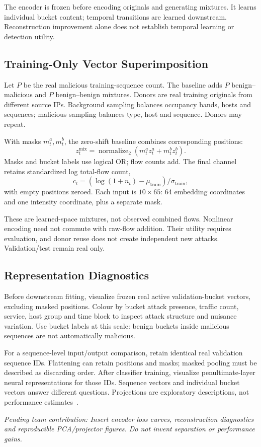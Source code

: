 \documentclass[conference]{IEEEtran}
\newcommand{\pending}[1]{\par\noindent\textit{Pending team contribution: #1}\par}
\begin{document}
The encoder is frozen before encoding originals and generating mixtures. It learns individual bucket content; temporal transitions are learned downstream. Reconstruction improvement alone does not establish temporal learning or detection utility.

\subsection{Training-Only Vector Superimposition}
Let $P$ be the real malicious training-sequence count. The baseline adds $P$ benign--malicious and $P$ benign--benign mixtures. Donors are real training originals from different source IPs. Background sampling balances occupancy bands, hosts and sequences; malicious sampling balances type, host and sequence. Donors may repeat.

With masks $m_t^a,m_t^b$, the zero-shift baseline combines corresponding positions:
\begin{equation}
z_t^{\mathrm{mix}}=\operatorname{normalize}_2(m_t^az_t^a+m_t^bz_t^b).
\end{equation}
Masks and bucket labels use logical OR; flow counts add. The final channel retains standardized log total-flow count,
\begin{equation}
c_t=(\log(1+n_t)-\mu_{\mathrm{train}})/\sigma_{\mathrm{train}},
\end{equation}
with empty positions zeroed. Each input is $10\times65$: 64 embedding coordinates and one intensity coordinate, plus a separate mask.

These are learned-space mixtures, not observed combined flows. Nonlinear encoding need not commute with raw-flow addition. Their utility requires evaluation, and donor reuse does not create independent new attacks. Validation/test remain real only.

\subsection{Representation Diagnostics}
Before downstream fitting, visualize frozen real active validation-bucket vectors, excluding masked positions. Colour by bucket attack presence, traffic count, service, host group and time block to inspect attack structure and nuisance variation. Use bucket labels at this scale: benign buckets inside malicious sequences are not automatically malicious.

For a sequence-level input/output comparison, retain identical real validation sequence IDs. Flattening can retain positions and masks; masked pooling must be described as discarding order. After classifier training, visualize penultimate-layer neural representations for those IDs. Sequence vectors and individual bucket vectors answer different questions. Projections are exploratory descriptions, not performance estimates~\cite{projector}.
\pending{Insert encoder loss curves, reconstruction diagnostics and reproducible PCA/projector figures. Do not invent separation or performance gains.}
\end{document}
